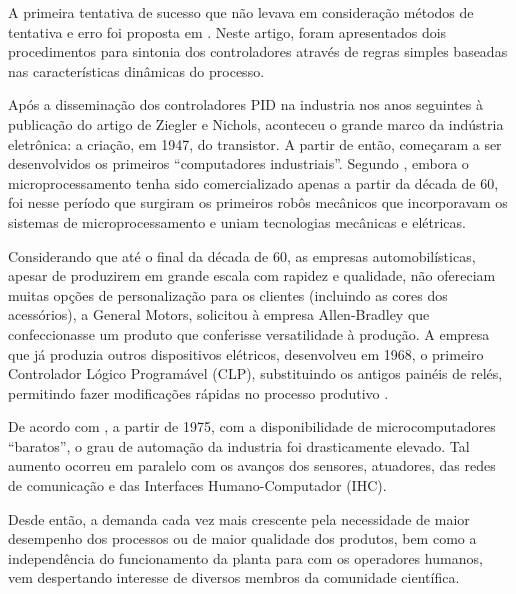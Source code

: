 A primeira tentativa de sucesso que não levava em consideração métodos de
tentativa e erro foi proposta em . Neste artigo, foram
apresentados dois procedimentos para sintonia dos controladores através de
regras simples baseadas nas características dinâmicas do processo.

Após a disseminação dos controladores PID na industria nos anos seguintes à
publicação do artigo de Ziegler e Nichols, aconteceu o grande marco da indústria
eletrônica: a criação, em 1947, do transistor. A partir de então, começaram a
ser desenvolvidos os primeiros ``computadores industriais''. Segundo
, embora o microprocessamento tenha sido comercializado
apenas a partir da década de 60, foi nesse período que surgiram os primeiros
robôs mecânicos que incorporavam os sistemas de microprocessamento e uniam
tecnologias mecânicas e elétricas.

Considerando que até o final da década de 60, as empresas automobilísticas,
apesar de produzirem em grande escala com rapidez e qualidade, não ofereciam
muitas opções de personalização para os clientes (incluindo as cores dos
acessórios), a General Motors, solicitou à empresa Allen-Bradley que
confeccionasse um produto que conferisse versatilidade à produção. A empresa que
já produzia outros dispositivos elétricos, desenvolveu em 1968, o primeiro
Controlador Lógico Programável (CLP), substituindo os antigos painéis de relés,
permitindo fazer modificações rápidas no processo produtivo \cite{goeking:2010}.


De acordo com , a partir de 1975, com a
disponibilidade de microcomputadores ``baratos'', o grau de automação da
industria foi drasticamente elevado. Tal aumento ocorreu em paralelo com os
avanços dos sensores, atuadores, das redes de comunicação e das Interfaces
Humano-Computador (IHC).


Desde então, a demanda cada vez mais crescente pela necessidade de maior
desempenho dos processos ou de maior qualidade dos produtos, bem como a
independência do funcionamento da planta para com os operadores humanos, vem
despertando interesse de diversos membros da comunidade científica.


